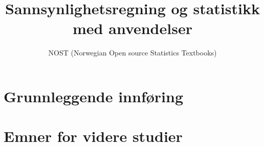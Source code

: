 \documentclass[oneside,norsk,11pt]{book}
\title{Sannsynlighetsregning og statistikk med anvendelser}
\author{NOST (Norwegian Open source Statistics Textbooks)}
\begin{document}


\maketitle
 

\tableofcontents
\mainmatter
\part{Grunnleggende innføring}
 
 
 
 
 
 
 
 

\part{Emner for videre studier}
 
 
 
 
 
 
 
 
 

\renewcommand\appendixname{Appendiks}
\appendix
 
 

 
\printindex
\end{document}
